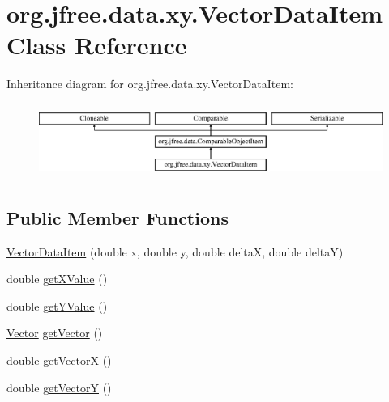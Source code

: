 \hypertarget{classorg_1_1jfree_1_1data_1_1xy_1_1_vector_data_item}{}\section{org.\+jfree.\+data.\+xy.\+Vector\+Data\+Item Class Reference}
\label{classorg_1_1jfree_1_1data_1_1xy_1_1_vector_data_item}
Inheritance diagram for org.\+jfree.\+data.\+xy.\+Vector\+Data\+Item\+:\begin{figure}[H]
\begin{center}
\leavevmode
\includegraphics[height=2.456140cm]{classorg_1_1jfree_1_1data_1_1xy_1_1_vector_data_item}
\end{center}
\end{figure}
\subsection*{Public Member Functions}
\begin{DoxyCompactItemize}
\item 
\mbox{\hyperlink{classorg_1_1jfree_1_1data_1_1xy_1_1_vector_data_item_a5bb7286e55d7f79f9caaf1ac6c15e297}{Vector\+Data\+Item}} (double x, double y, double deltaX, double deltaY)
\item 
double \mbox{\hyperlink{classorg_1_1jfree_1_1data_1_1xy_1_1_vector_data_item_a218f9c23039c2effc8308eac0d4d9f58}{get\+X\+Value}} ()
\item 
double \mbox{\hyperlink{classorg_1_1jfree_1_1data_1_1xy_1_1_vector_data_item_a6c59869ba389fd3712d943d268d11df9}{get\+Y\+Value}} ()
\item 
\mbox{\hyperlink{classorg_1_1jfree_1_1data_1_1xy_1_1_vector}{Vector}} \mbox{\hyperlink{classorg_1_1jfree_1_1data_1_1xy_1_1_vector_data_item_a1f68c8440cb43f72d0c7d1790ec7bb06}{get\+Vector}} ()
\item 
double \mbox{\hyperlink{classorg_1_1jfree_1_1data_1_1xy_1_1_vector_data_item_a430cc7a9b69367551f4c1c96f5e9c973}{get\+VectorX}} ()
\item 
double \mbox{\hyperlink{classorg_1_1jfree_1_1data_1_1xy_1_1_vector_data_item_afda554b8d01bb729701d0ea278925481}{get\+VectorY}} ()
\end{DoxyCompactItemize}
